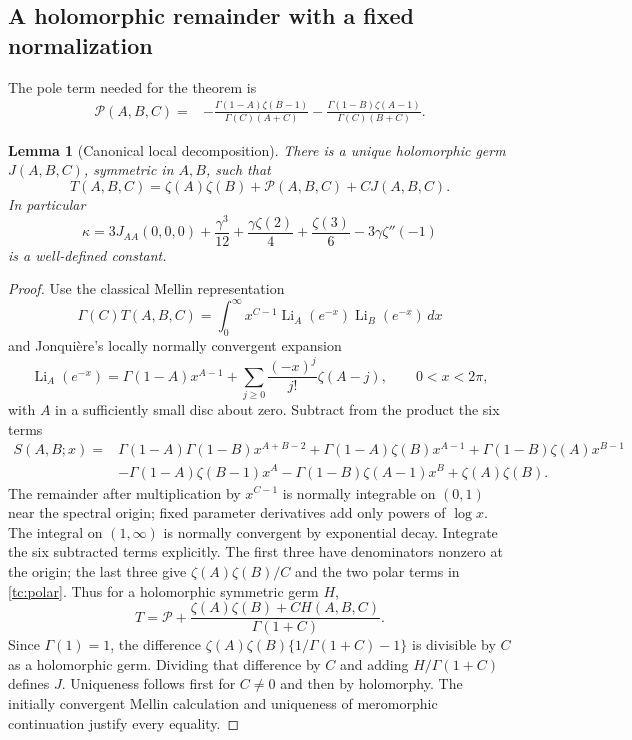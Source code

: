 \documentclass[11pt,a4paper]{article}
\numberwithin{equation}{section}
\theoremstyle{plain}
\newtheorem{lemma}[theorem]{Lemma}
\theoremstyle{definition}
\theoremstyle{remark}
\begin{document}
\subsection{A holomorphic remainder with a fixed normalization}

The pole term needed for the theorem is
\begin{align}
 \mathscr P(A,B,C)
 ={}&-\frac{\Gamma(1-A)\zeta(B-1)}{\Gamma(C)(A+C)}
     -\frac{\Gamma(1-B)\zeta(A-1)}{\Gamma(C)(B+C)}.
 \label{tc:polar}
\end{align}

\begin{lemma}[Canonical local decomposition]
\label{tc:local}
There is a unique holomorphic germ $J(A,B,C)$, symmetric in $A,B$,
such that
\begin{equation}
 T(A,B,C)=\zeta(A)\zeta(B)+\mathscr P(A,B,C)+C J(A,B,C).
 \label{tc:decomposition}
\end{equation}
In particular
\begin{equation}
 \kappa=3J_{AA}(0,0,0)+\frac{\gamma^3}{12}
       +\frac{\gamma\zeta(2)}4+\frac{\zeta(3)}6
       -3\gamma\zeta''(-1)
 \label{tc:kappa-def}
\end{equation}
is a well-defined constant.
\end{lemma}

\begin{proof}
Use the classical Mellin representation
\[
 \Gamma(C)T(A,B,C)
   =\int_0^\infty x^{C-1}
       \operatorname{Li}_A(e^{-x})\operatorname{Li}_B(e^{-x})\,dx
\]
and Jonqui\`ere's locally normally convergent expansion
\[
 \operatorname{Li}_A(e^{-x})
   =\Gamma(1-A)x^{A-1}
     +\sum_{j\ge0}\frac{(-x)^j}{j!}\zeta(A-j),
 \qquad 0<x<2\pi,
\]
with $A$ in a sufficiently small disc about zero.  Subtract from the
product the six terms
\begin{align*}
 S(A,B;x)={}&\Gamma(1-A)\Gamma(1-B)x^{A+B-2}
 +\Gamma(1-A)\zeta(B)x^{A-1}
 +\Gamma(1-B)\zeta(A)x^{B-1}\\
 &-\Gamma(1-A)\zeta(B-1)x^A
 -\Gamma(1-B)\zeta(A-1)x^B+\zeta(A)\zeta(B).
\end{align*}
The remainder after multiplication by $x^{C-1}$ is normally
integrable on $(0,1)$ near the spectral origin; fixed parameter
derivatives add only powers of $\log x$.  The integral on
$(1,\infty)$ is normally convergent by exponential decay.  Integrate
the six subtracted terms explicitly.  The first three have
denominators nonzero at the origin; the last three give
$\zeta(A)\zeta(B)/C$ and the two polar terms in
\eqref{tc:polar}.  Thus for a holomorphic symmetric germ $H$,
\[
 T=\mathscr P+\frac{\zeta(A)\zeta(B)+C H(A,B,C)}{\Gamma(1+C)}.
\]
Since $\Gamma(1)=1$, the difference
$\zeta(A)\zeta(B)\{1/\Gamma(1+C)-1\}$ is divisible by $C$ as a
holomorphic germ.  Dividing that difference by $C$ and adding
$H/\Gamma(1+C)$ defines $J$.  Uniqueness follows first for $C\ne0$
and then by holomorphy.  The initially convergent Mellin calculation
and uniqueness of meromorphic continuation justify every equality.
\end{proof}
\end{document}
